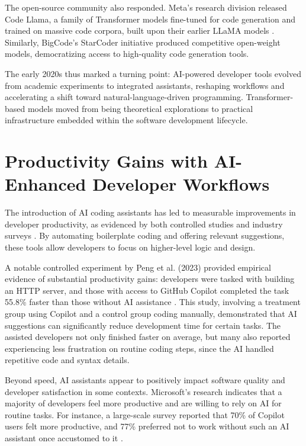 The open-source community also responded. Meta’s research division released Code Llama, a family of Transformer models fine-tuned for code generation and trained on massive code corpora, built upon their earlier LLaMA models \autocite{codellama2023}. Similarly, BigCode’s StarCoder initiative produced competitive open-weight models, democratizing access to high-quality code generation tools.

The early 2020s thus marked a turning point: \gls{AI}-powered developer tools evolved from academic experiments to integrated assistants, reshaping workflows and accelerating a shift toward natural-language-driven programming. Transformer-based models moved from being theoretical explorations to practical infrastructure embedded within the software development lifecycle.

\section{Productivity Gains with AI-Enhanced Developer Workflows}
\label{sec:productivity-gains}
The introduction of \gls{AI} coding assistants has led to measurable improvements in developer productivity, as evidenced by both controlled studies and industry surveys \autocite{Ziegler2025}. By automating boilerplate coding and offering relevant suggestions, these tools allow developers to focus on higher-level logic and design.

A notable controlled experiment by Peng et al. (2023) provided empirical evidence of substantial productivity gains: developers were tasked with building an HTTP server, and those with access to GitHub Copilot completed the task 55.8\% faster than those without \gls{AI} assistance \autocite{Peng2023}. This study, involving a treatment group using Copilot and a control group coding manually, demonstrated that \gls{AI} suggestions can significantly reduce development time for certain tasks. The assisted developers not only finished faster on average, but many also reported experiencing less frustration on routine coding steps, since the \gls{AI} handled repetitive code and syntax details.

Beyond speed, \gls{AI} assistants appear to positively impact software quality and developer satisfaction in some contexts. Microsoft's research indicates that a majority of developers feel more productive and are willing to rely on \gls{AI} for routine tasks. For instance, a large-scale survey reported that 70\% of Copilot users felt more productive, and 77\% preferred not to work without such an \gls{AI} assistant once accustomed to it \autocite{Microsoft2023Copilot}.

